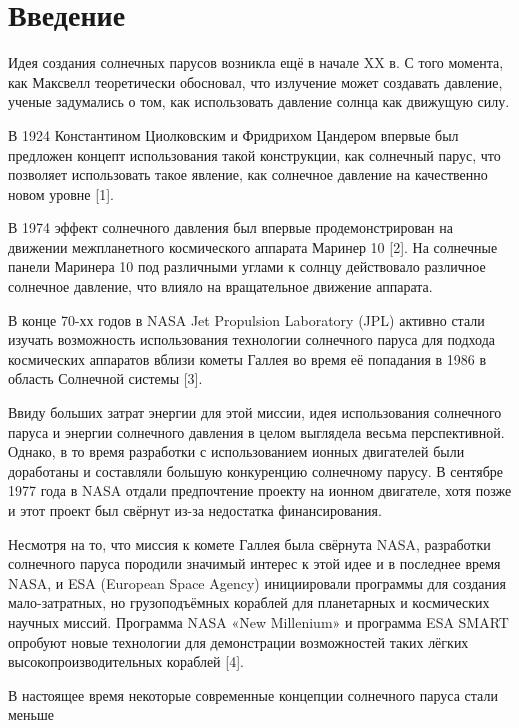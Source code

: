 \usetikzlibrary{calc}
\usetikzlibrary{intersections}
\usetikzlibrary{angles}
\usetikzlibrary{quotes}

\chapter{Введение}
\noindent\indent Идея создания солнечных парусов возникла ещё в начале XX в.
С того момента, как Максвелл теоретически обосновал, что излучение может создавать давление,
ученые задумались о том, как использовать давление солнца как движущую силу.\par
    В 1924 Константином Циолковским и Фридрихом Цандером впервые был предложен концепт
использования такой конструкции, как солнечный парус, что позволяет использовать
такое явление, как солнечное давление на качественно новом уровне [1].\par
    В 1974 эффект солнечного давления был впервые продемонстрирован на движении межпланетного
космического аппарата Маринер 10 [2]. На солнечные панели Маринера 10 под различными углами к солнцу
действовало различное солнечное давление, что влияло на вращательное движение аппарата.\par
    В конце 70-хх годов в NASA Jet Propulsion Laboratory (JPL) активно стали изучать
возможность использования технологии солнечного паруса для подхода космических аппаратов
вблизи кометы Галлея во время её попадания в 1986 в область Солнечной системы [3].\par
    Ввиду больших затрат энергии для этой миссии, идея использования солнечного паруса
и энергии солнечного давления в целом выглядела весьма перспективной. Однако, в то
время разработки с использованием ионных двигателей были доработаны и составляли
большую конкуренцию солнечному парусу. В сентябре 1977 года в NASA отдали
предпочтение проекту на ионном двигателе, хотя позже и этот проект был свёрнут
из-за недостатка финансирования.\par
    Несмотря на то, что миссия к комете Галлея была свёрнута NASA, разработки солнечного паруса
породили значимый интерес к этой идее и в последнее время NASA, и ESA (European Space Agency)
инициировали программы для создания мало-затратных, но грузоподъёмных кораблей
для планетарных и космических научных миссий. Программа NASA «New Millenium» и
программа ESA SMART опробуют новые технологии для демонстрации возможностей таких
лёгких высокопроизводительных кораблей [4].\par
    В настоящее время некоторые современные концепции солнечного паруса стали меньше
